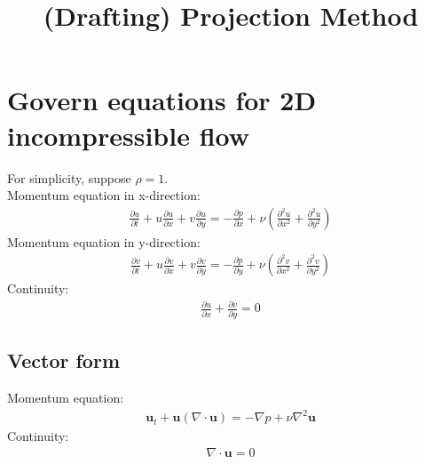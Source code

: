 \documentclass[11pt,dvips]{article}
\title{
%
(Drafting) Projection Method
%
}
\author{
%
%
}
\numberwithin{equation}{section}
\begin{document}
\maketitle

\begin{abstract}
%
%
\end{abstract}

%
\label{s:projection}
\section{Govern equations for 2D incompressible flow}
For simplicity, suppose $\rho=1$. \\
Momentum equation in x-direction:
\begin{align*}
\frac{\partial u}{\partial t}+u \frac{\partial u}{\partial x}+v \frac{\partial u}{\partial y}=-\frac{\partial p}{\partial x}+ \nu (\frac{\partial^2 u}{\partial x^2}+\frac{\partial^2 u}{\partial y^2})
\tag{1}
\end{align*}
Momentum equation in y-direction:
\begin{align*}
\frac{\partial v}{\partial t}+u \frac{\partial v}{\partial x}+v \frac{\partial v}{\partial y}=-\frac{\partial p}{\partial y}+ \nu (\frac{\partial^2 v}{\partial x^2}+\frac{\partial^2 v}{\partial y^2})
\tag{2}
\end{align*}
Continuity:  
\begin{align*}
\frac{\partial u}{\partial x}+\frac{\partial v}{\partial y}=0
\tag{3}
\end{align*}

\subsection{ Vector form}
Momentum equation:
\begin{align*}
\mathbf{u}_t+\mathbf{u}(\nabla \cdot \mathbf{u})=-\nabla p+\nu \nabla^2 \mathbf{u} 
\tag{4}
\end{align*}
Continuity:
\begin{align*}
\nabla \cdot \mathbf{u}=0
\tag{5}
\end{align*}
\end{document}
